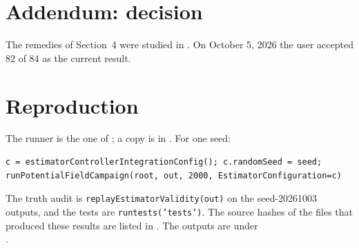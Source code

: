 \documentclass[11pt]{article}
\begin{document}
\section{Addendum: decision}
The remedies of Section~4 were studied in
. On October 5, 2026
the user accepted 82 of 84 as the current result.

\section{Reproduction}
The runner is the one of ; a copy is in
. For one seed:
\begin{verbatim}
c = estimatorControllerIntegrationConfig(); c.randomSeed = seed;
runPotentialFieldCampaign(root, out, 2000, EstimatorConfiguration=c)
\end{verbatim}
The truth audit is \texttt{replayEstimatorValidity(out)} on the
seed-20261003 outputs, and the tests are \texttt{runtests('tests')}. The
source hashes of the files that produced these results are listed in
. The outputs are
under\\
.
\end{document}
